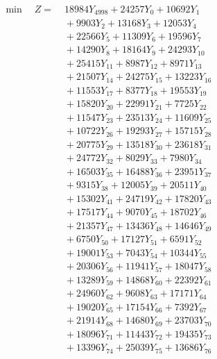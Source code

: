 \documentclass[a4paper,10pt]{article}
\begin{document}
\allowdisplaybreaks
{\small
\begin{align}
\min \quad Z = &\; 18984 Y_{4998} + 24257 Y_{0} + 10692 Y_{1} \\[0.3ex]
&\;  + 9903 Y_{2} + 13168 Y_{3} + 12053 Y_{4} \\[0.3ex]
&\;  + 22566 Y_{5} + 11309 Y_{6} + 19596 Y_{7} \\[0.3ex]
&\;  + 14290 Y_{8} + 18164 Y_{9} + 24293 Y_{10} \\[0.3ex]
&\;  + 25415 Y_{11} + 8987 Y_{12} + 8971 Y_{13} \\[0.3ex]
&\;  + 21507 Y_{14} + 24275 Y_{15} + 13223 Y_{16} \\[0.3ex]
&\;  + 11553 Y_{17} + 8377 Y_{18} + 19553 Y_{19} \\[0.3ex]
&\;  + 15820 Y_{20} + 22991 Y_{21} + 7725 Y_{22} \\[0.3ex]
&\;  + 11547 Y_{23} + 23513 Y_{24} + 11609 Y_{25} \\[0.3ex]
&\;  + 10722 Y_{26} + 19293 Y_{27} + 15715 Y_{28} \\[0.5ex]\allowbreak
&\;  + 20775 Y_{29} + 13518 Y_{30} + 23618 Y_{31} \\[0.3ex]
&\;  + 24772 Y_{32} + 8029 Y_{33} + 7980 Y_{34} \\[0.3ex]
&\;  + 16503 Y_{35} + 16488 Y_{36} + 23951 Y_{37} \\[0.3ex]
&\;  + 9315 Y_{38} + 12005 Y_{39} + 20511 Y_{40} \\[0.3ex]
&\;  + 15302 Y_{41} + 24719 Y_{42} + 17820 Y_{43} \\[0.3ex]
&\;  + 17517 Y_{44} + 9070 Y_{45} + 18702 Y_{46} \\[0.3ex]
&\;  + 21357 Y_{47} + 13436 Y_{48} + 14646 Y_{49} \\[0.3ex]
&\;  + 6750 Y_{50} + 17127 Y_{51} + 6591 Y_{52} \\[0.3ex]
&\;  + 19001 Y_{53} + 7043 Y_{54} + 10344 Y_{55} \\[0.3ex]
&\;  + 20306 Y_{56} + 11941 Y_{57} + 18047 Y_{58} \\[0.5ex]\allowbreak
&\;  + 13289 Y_{59} + 14868 Y_{60} + 22392 Y_{61} \\[0.3ex]
&\;  + 24960 Y_{62} + 9608 Y_{63} + 17171 Y_{64} \\[0.3ex]
&\;  + 19020 Y_{65} + 17154 Y_{66} + 7392 Y_{67} \\[0.3ex]
&\;  + 21914 Y_{68} + 14680 Y_{69} + 23703 Y_{70} \\[0.3ex]
&\;  + 18096 Y_{71} + 11443 Y_{72} + 19435 Y_{73} \\[0.3ex]
&\;  + 13396 Y_{74} + 25039 Y_{75} + 13686 Y_{76} \\[0.3ex]

\end{align}}
\end{document}
